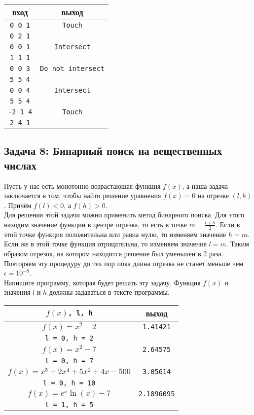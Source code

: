 \documentclass{article}
\begin{document}
\begin{center}
\begin{tabular}{ c c }
 вход & выход \\ \hline
 \texttt{0 0 1} & \texttt{Touch}  \\ 
 \texttt{0 2 1} &   \\  \hline
 \texttt{0 0 1} & \texttt{Intersect}  \\ 
 \texttt{1 1 1} &   \\  \hline
 \texttt{0 0 3} & \texttt{Do not intersect}  \\ 
 \texttt{5 5 4} &   \\  \hline
 \texttt{0 0 4} & \texttt{Intersect}  \\ 
 \texttt{5 5 4} &   \\  \hline
 \texttt{-2 1 4} & \texttt{Touch}  \\ 
 \texttt{2 4 1} &   \\
\end{tabular}
\end{center}


\subsection*{Задача 8: Бинарный поиск на вещественных числах} 
Пусть у нас есть монотонно возрастающая функция $f(x)$, а наша задача заключается в том, чтобы найти решение уравнения $f(x) = 0$ на отрезке $(l, h)$. Причём $f(l) < 0$, а $f(h) > 0$. \\

Для решения этой задачи можно применить метод бинарного поиска. Для этого находим значение функции в центре отрезка, то есть в точке $m = \frac{l + h}{2}$. Если в этой точке функция положительна или равна нулю, то изменяем значение $h = m$. Если же в этой точке функция отрицательна, то изменяем значение $l = m$. Таким образом отрезок, на котором находится решение был уменьшен в 2 раза. Повторяем эту процедуру до тех пор пока длина отрезка не станет меньше чем $\epsilon = 10^{-8}$.\\

Напишите программу, которая будет решать эту задачу. Функция $f(x)$ и значения $l$ и $h$ должны задаваться в тексте программы.

\renewcommand{\arraystretch}{1.3}
\begin{center}
\begin{tabular}{ c | c }
 $f(x)$\texttt{, l, h} & выход \\ \hline
 $f(x) = x^2 - 2$  & \texttt{1.41421}  \\ 
 \texttt{l = 0, h = 2} &   \\ \hline
 $f(x) = x^2 - 7$  & \texttt{2.64575}  \\ 
 \texttt{l = 0, h = 7} &   \\ \hline
 $f(x) = x^5 + 2x^4 + 5x^2 +4x - 500$  & \texttt{3.05614}  \\ 
 \texttt{l = 0, h = 10} &   \\\hline
 $f(x) = e^x \ln(x) - 7$  & \texttt{2.1896095}  \\ 
 \texttt{l = 1, h = 5} &   \\
\end{tabular}
\end{center}
\renewcommand{\arraystretch}{1}
\end{document}
